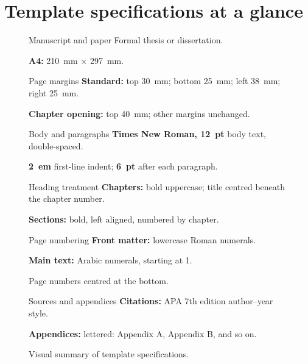 \documentclass[11pt,a4paper]{article}
\begin{document}
\section{Template specifications at a glance}

\begin{figure}[H]
\begin{tcbraster}[raster columns=2,raster equal height=rows,raster column skip=9pt,
  raster row skip=9pt]
\begin{card}{Manuscript and paper}
  Formal thesis or dissertation.\par
  \textbf{A4:} 210~mm $\times$ 297~mm.
\end{card}
\begin{card}{Page margins}
  \textbf{Standard:} top 30~mm; bottom 25~mm; left 38~mm; right 25~mm.\par
  \textbf{Chapter opening:} top 40~mm; other margins unchanged.
\end{card}
\begin{card}{Body and paragraphs}
  \textbf{Times New Roman, 12~pt} body text, double-spaced.\par
  \textbf{2~em} first-line indent; \textbf{6~pt} after each paragraph.
\end{card}
\begin{card}{Heading treatment}
  \textbf{Chapters:} bold uppercase; title centred beneath the chapter number.\par
  \textbf{Sections:} bold, left aligned, numbered by chapter.
\end{card}
\begin{card}{Page numbering}
  \textbf{Front matter:} lowercase Roman numerals.\par
  \textbf{Main text:} Arabic numerals, starting at 1.\par
  Page numbers centred at the bottom.
\end{card}
\begin{card}{Sources and appendices}
  \textbf{Citations:} APA 7th edition author--year style.\par
  \textbf{Appendices:} lettered: Appendix A, Appendix B, and so on.
\end{card}
\end{tcbraster}
\caption{Visual summary of template specifications.}
\label{fig:glance}
\end{figure}
\end{document}
